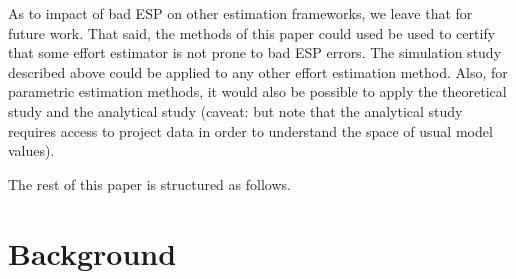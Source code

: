 \documentclass[final,twocolumn,5p]{elsarticle}
\theoremstyle{break}
\begin{document}
  As to impact of bad ESP on other estimation frameworks, we leave that for future work.
  That said, the methods of this paper could used be used to  certify that some effort
  estimator  is not prone to bad ESP
  errors.  The simulation study described above
   could be applied to any other
   effort estimation method. Also, for parametric estimation methods, it would also be possible to apply
   the theoretical study and the analytical study  (caveat: but
   note that the analytical study requires access to project data in order to understand the space of
  usual model values).
  
  The rest of this paper is structured as follows.
  
\section{Background}


  
\end{document}
